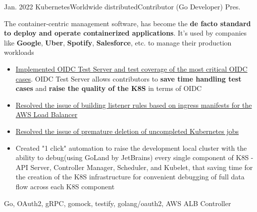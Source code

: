 %
%
%

\begin{experiences}
  \experience
    {Jan. 2022} {Kubernetes}{Worldwide distributed}{Contributor (Go Developer)}
    {Pres.}
    {
      The container-centric management software, has become the \textbf{de facto standard to deploy and operate containerized applications}.
      It's used by companies like \textbf{Google}, \textbf{Uber}, \textbf{Spotify}, \textbf{Salesforce}, etc. to manage their production workloads
      \begin{itemize}
        \item {\href{https://github.com/kubernetes/kubernetes/issues/110782}
        {Implemented OIDC Test Server and test coverage of the most critical OIDC cases}.
        OIDC Test Server allows contributors to \textbf{save time handling test cases} and \textbf{raise the quality of the K8S} in terms of OIDC}
        \item {\href{https://github.com/kubernetes-sigs/aws-load-balancer-controller/pull/2735}
        {Resolved the issue of building listener rules based on ingress manifests for the AWS Load Balancer}}
        \item {\href{https://github.com/kubernetes/kubernetes/issues/110464}
        {Resolved the issue of premature deletion of uncompleted Kubernetes jobs}}
        \item {Created "1 click" automation to raise the development local cluster with the ability
        to debug(using GoLand by JetBrains) every single component of K8S - API Server, Controller Manager, Scheduler, and Kubelet,
          that saving time for the creation of the K8S infrastructure for convenient debugging of full data flow across each K8S component}
      \end{itemize}
    }
    {
      Go, OAuth2, gRPC, gomock, testify, golang/oauth2, AWS ALB Controller
    }
  \emptySeparator


\end{experiences}
